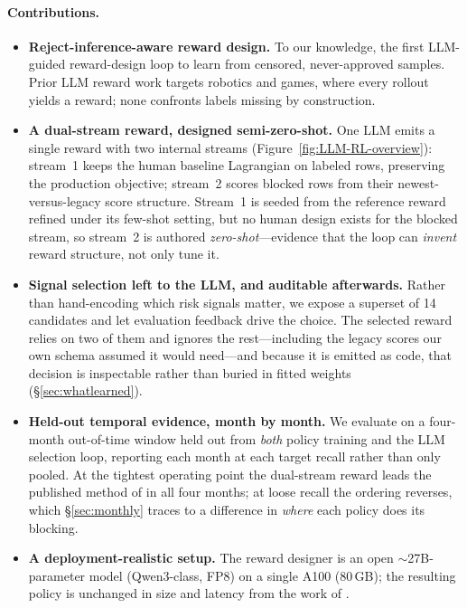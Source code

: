 \documentclass[11pt]{article}
\begin{document}
\paragraph{Contributions.}
\begin{itemize}
\item \textbf{Reject-inference-aware reward design.} To our knowledge, the first
LLM-guided reward-design loop to learn from censored, never-approved samples. Prior LLM
reward work \cite{ma2023eureka,li2024automc,yu2023language} targets robotics and games,
where every rollout yields a reward; none confronts labels missing by construction.
\item \textbf{A dual-stream reward, designed semi-zero-shot.} One LLM emits a single reward with
two internal streams (Figure~\ref{fig:LLM-RL-overview}): stream~1 keeps the human baseline
Lagrangian on labeled rows, preserving the production objective; stream~2 scores blocked rows from
their newest-versus-legacy score structure. Stream~1 is seeded from the reference reward
\citet{qu2025llmenhanced} refined under its few-shot setting, but no human design exists for the
blocked stream, so stream~2 is authored \emph{zero-shot}---evidence that the loop can
\emph{invent} reward structure, not only tune it.
\item \textbf{Signal selection left to the LLM, and auditable afterwards.} Rather than
hand-encoding which risk signals matter, we expose a superset of 14 candidates and let evaluation
feedback drive the choice. The selected reward relies on two of them and ignores
the rest---including the legacy scores our own schema assumed it would need---and because it is
emitted as code, that decision is inspectable rather than buried in fitted weights (\S\ref{sec:whatlearned}).
\item \textbf{Held-out temporal evidence, month by month.} We evaluate on a four-month
out-of-time window held out from \emph{both} policy training and the LLM selection loop, reporting
each month at each target recall rather than only pooled. At the tightest operating point the
dual-stream reward leads the published method of \citet{qu2025llmenhanced} in all four months; at
loose recall the ordering reverses, which \S\ref{sec:monthly} traces to a difference in \emph{where}
each policy does its blocking.
\item \textbf{A deployment-realistic setup.} The reward designer is an open
$\sim$27B-parameter model (Qwen3-class, FP8) on a single A100 (80\,GB); the resulting policy is
unchanged in size and latency from the work of \citet{qu2025llmenhanced}.
\end{itemize}
\end{document}
